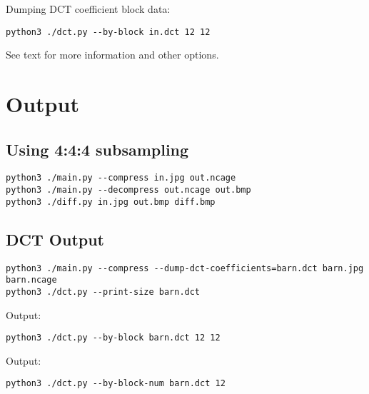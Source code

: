 \documentclass{article}
\begin{document}
\noindent
Dumping DCT coefficient block data:
\begin{lstlisting}
python3 ./dct.py --by-block in.dct 12 12
\end{lstlisting}

\noindent
See  text for more information and other options.


\section{Output}

\subsection{Using 4:4:4 subsampling}
\begin{lstlisting}
python3 ./main.py --compress in.jpg out.ncage
python3 ./main.py --decompress out.ncage out.bmp
python3 ./diff.py in.jpg out.bmp diff.bmp
\end{lstlisting}







\subsection{DCT Output}

\begin{lstlisting}
python3 ./main.py --compress --dump-dct-coefficients=barn.dct barn.jpg barn.ncage
python3 ./dct.py --print-size barn.dct
\end{lstlisting}

\noindent Output:


\newpage
\begin{lstlisting}
python3 ./dct.py --by-block barn.dct 12 12
\end{lstlisting}

\noindent Output:


\begin{lstlisting}
python3 ./dct.py --by-block-num barn.dct 12
\end{lstlisting}
\end{document}
